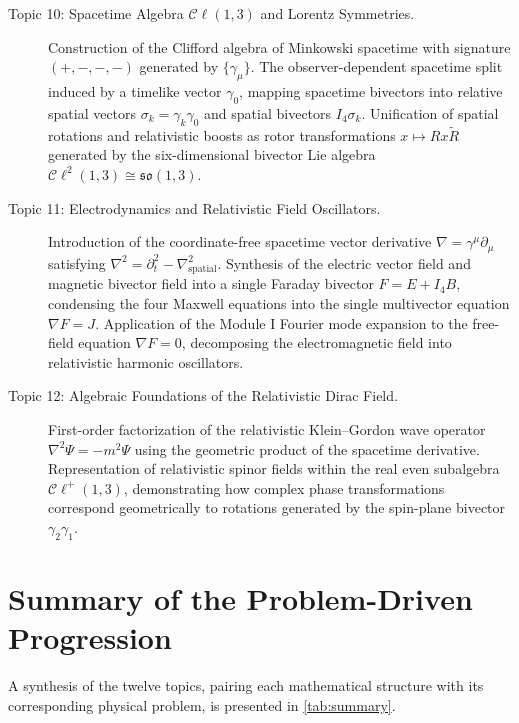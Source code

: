 \documentclass[11pt,a4paper]{article}
\newcommand{\Cl}{\mathcal{C}\ell}
\begin{document}
\begin{description}
  \item[Topic 10: Spacetime Algebra $\Cl(1,3)$ and Lorentz Symmetries.]
    Construction of the Clifford algebra of Minkowski spacetime with signature
    $(+,-,-,-)$ generated by $\{\gamma_{\mu}\}$. The observer-dependent
    spacetime split induced by a timelike vector $\gamma_{0}$, mapping
    spacetime bivectors into relative spatial vectors
    $\sigma_{k} = \gamma_{k}\gamma_{0}$ and spatial bivectors
    $I_{4}\sigma_{k}$. Unification of spatial rotations and relativistic boosts
    as rotor transformations $x \mapsto Rx\tilde{R}$ generated by the
    six-dimensional bivector Lie algebra
    $\Cl^{2}(1,3) \cong \mathfrak{so}(1,3)$.

  \item[Topic 11: Electrodynamics and Relativistic Field Oscillators.]
    Introduction of the coordinate-free spacetime vector derivative
    $\nabla = \gamma^{\mu}\partial_{\mu}$ satisfying
    $\nabla^{2} = \partial_{t}^{2} - \nabla_{\mathrm{spatial}}^{2}$. Synthesis
    of the electric vector field and magnetic bivector field into a single
    Faraday bivector $F = E + I_{4}B$, condensing the four Maxwell equations
    into the single multivector equation $\nabla F = J$. Application of the
    Module I Fourier mode expansion to the free-field equation $\nabla F = 0$,
    decomposing the electromagnetic field into relativistic harmonic
    oscillators.

  \item[Topic 12: Algebraic Foundations of the Relativistic Dirac Field.]
    First-order factorization of the relativistic Klein--Gordon wave operator
    $\nabla^{2}\Psi = -m^{2}\Psi$ using the geometric product of the spacetime
    derivative. Representation of relativistic spinor fields within the real
    even subalgebra $\Cl^{+}(1,3)$, demonstrating how complex phase
    transformations correspond geometrically to rotations generated by the
    spin-plane bivector $\gamma_{2}\gamma_{1}$.
\end{description}

\section{Summary of the Problem-Driven Progression}
\label{sec:summary}

A synthesis of the twelve topics, pairing each mathematical structure with its
corresponding physical problem, is presented in \cref{tab:summary}.
\end{document}
